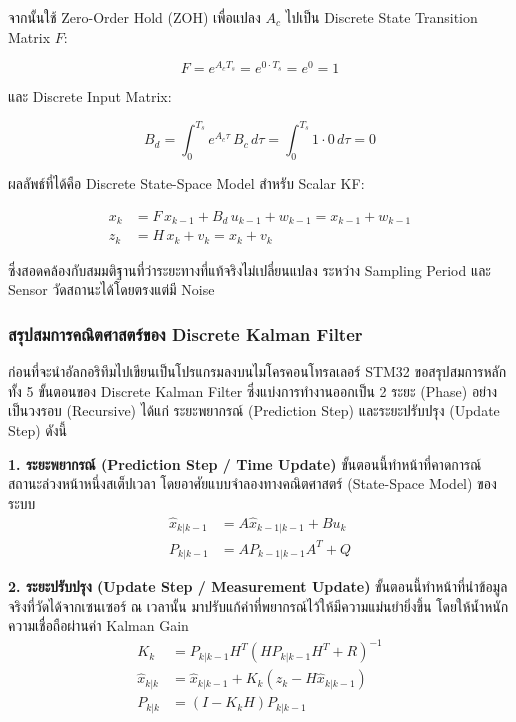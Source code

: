 จากนั้นใช้ Zero-Order Hold (ZOH) เพื่อแปลง $A_c$ ไปเป็น
Discrete State Transition Matrix $F$:

\begin{equation}
    F = e^{A_c T_s}
      = e^{0 \cdot T_s}
      = e^{0}
      = 1
    \label{eq:scalar_F_derive}
\end{equation}

และ Discrete Input Matrix:

\begin{equation}
    B_d = \int_0^{T_s} e^{A_c \tau}\,B_c\,d\tau
        = \int_0^{T_s} 1 \cdot 0\,d\tau
        = 0
    \label{eq:scalar_Bd_derive}
\end{equation}

ผลลัพธ์ที่ได้คือ Discrete State-Space Model สำหรับ Scalar KF:

\begin{align}
    x_k      &= F\,x_{k-1} + B_d\,u_{k-1} + w_{k-1}
               = x_{k-1} + w_{k-1}
               \label{eq:scalar_state_disc} \\
    z_k      &= H\,x_k + v_k
               = x_k + v_k
               \label{eq:scalar_obs_disc}
\end{align}

ซึ่งสอดคล้องกับสมมติฐานที่ว่าระยะทางที่แท้จริงไม่เปลี่ยนแปลง
ระหว่าง Sampling Period และ Sensor วัดสถานะได้โดยตรงแต่มี Noise

\subsubsection{สรุปสมการคณิตศาสตร์ของ Discrete Kalman Filter}

ก่อนที่จะนำอัลกอริทึมไปเขียนเป็นโปรแกรมลงบนไมโครคอนโทรลเลอร์ STM32 ขอสรุปสมการหลักทั้ง 5 ขั้นตอนของ Discrete Kalman Filter ซึ่งแบ่งการทำงานออกเป็น 2 ระยะ (Phase) อย่างเป็นวงรอบ (Recursive) ได้แก่ ระยะพยากรณ์ (Prediction Step) และระยะปรับปรุง (Update Step) ดังนี้



\textbf{1. ระยะพยากรณ์ (Prediction Step / Time Update)}
ขั้นตอนนี้ทำหน้าที่คาดการณ์สถานะล่วงหน้าหนึ่งสเต็ปเวลา โดยอาศัยแบบจำลองทางคณิตศาสตร์ (State-Space Model) ของระบบ
\begin{align}
    \hat{x}_{k|k-1} &= A \hat{x}_{k-1|k-1} + B u_k \label{eq:kf_predict_state} \\
    P_{k|k-1} &= A P_{k-1|k-1} A^T + Q \label{eq:kf_predict_cov}
\end{align}

\textbf{2. ระยะปรับปรุง (Update Step / Measurement Update)}
ขั้นตอนนี้ทำหน้าที่นำข้อมูลจริงที่วัดได้จากเซนเซอร์ ณ เวลานั้น มาปรับแก้ค่าที่พยากรณ์ไว้ให้มีความแม่นยำยิ่งขึ้น โดยให้น้ำหนักความเชื่อถือผ่านค่า Kalman Gain
\begin{align}
    K_k &= P_{k|k-1} H^T (H P_{k|k-1} H^T + R)^{-1} \label{eq:kf_kalman_gain} \\
    \hat{x}_{k|k} &= \hat{x}_{k|k-1} + K_k (z_k - H \hat{x}_{k|k-1}) \label{eq:kf_update_state} \\
    P_{k|k} &= (I - K_k H) P_{k|k-1} \label{eq:kf_update_cov}
\end{align}

